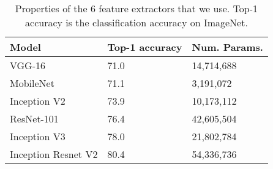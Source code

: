 \documentclass[10pt,twocolumn,letterpaper]{article}
\begin{document}
\begin{table}
  \begin{tabular}{lll}
    Model & Top-1 accuracy & Num. Params. \\ \hline
    VGG-16 & 71.0 & 14,714,688 \\
    MobileNet & 71.1 & 3,191,072\\
    Inception V2 & 73.9 & 10,173,112\\
    ResNet-101 & 76.4 & 42,605,504\\
    Inception V3 & 78.0 & 21,802,784 \\
    Inception Resnet V2 & 80.4 & 54,336,736
  \end{tabular}
  \caption{Properties of the 6 feature extractors that we use.
    Top-1 accuracy is the classification accuracy on ImageNet.}
  \label{tab:features}
  \end{table}
\end{document}
